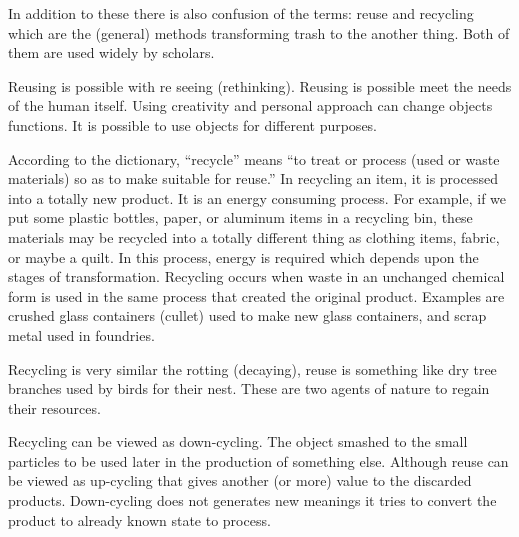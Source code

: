 In addition to these there is also confusion of the terms: reuse and recycling which are the (general) methods transforming trash to the another thing. Both of them are used widely by scholars. 

 Reusing is possible with re seeing (rethinking). Reusing is possible meet the needs of the human itself. Using creativity and personal approach can change objects functions. It is possible to use objects for different purposes. 


According to the dictionary, “recycle” means “to treat or process (used or waste materials) so as to make suitable for reuse.” In recycling an item, it is processed into a totally new product. It is an energy consuming process. For example, if we put some plastic bottles, paper, or aluminum items in a recycling bin, these materials may be recycled into a totally different thing as clothing items, fabric, or maybe a quilt. In this process, energy is required which depends upon the stages of transformation. Recycling occurs when waste in an unchanged chemical form is used in the same process that created the original product. Examples are crushed glass containers (cullet) used to make new glass containers, and scrap metal used in foundries. 

Recycling is very similar the rotting (decaying), reuse is something like dry tree branches used by birds for their nest. These are two agents of nature to regain their resources.

Recycling can be viewed as down-cycling. The object smashed to the small particles to be used later in the production of something else. Although reuse can be viewed as up-cycling that gives another (or more) value to the discarded products. Down-cycling does not generates new meanings it tries to convert the product to already known state to process. 


